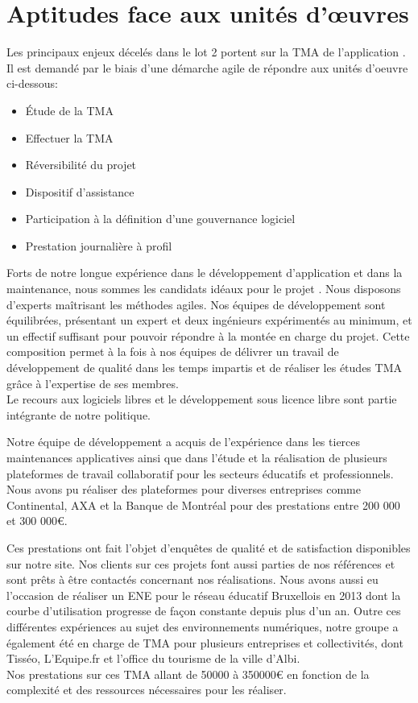 \section{Aptitudes face aux unités d'œuvres}
	Les principaux enjeux décelés dans le lot 2 portent sur la TMA de l’application \correlyce{}. Il est demandé par le biais d’une démarche agile de répondre aux unités d’oeuvre ci-dessous: 
	
	\begin{itemize}
		\item Étude de la TMA
		\item Effectuer la TMA
		\item Réversibilité du projet
		\item Dispositif d’assistance
		\item Participation à la définition d’une gouvernance logiciel
		\item Prestation journalière à profil 
	\end{itemize}

	Forts de notre longue expérience dans le développement d’application et dans la maintenance, nous sommes les candidats idéaux pour le projet \correlyce{}. Nous disposons d’experts maîtrisant les méthodes agiles. Nos équipes de développement sont équilibrées, présentant un expert et deux ingénieurs expérimentés au minimum, et un effectif suffisant pour pouvoir répondre à la montée en charge du projet. Cette composition permet à la fois à nos équipes de délivrer un travail de développement de qualité dans les temps impartis et de réaliser les études TMA grâce à l’expertise de ses membres. \\ Le recours aux logiciels libres et le développement sous licence libre sont partie intégrante de notre politique.
	
	Notre équipe de développement a acquis de l’expérience dans les tierces maintenances applicatives ainsi que dans l’étude et la réalisation de plusieurs plateformes de travail collaboratif pour les secteurs éducatifs et professionnels. Nous avons pu réaliser des plateformes pour diverses entreprises comme Continental, AXA et la Banque de Montréal pour des prestations entre 200 000 et 300 000\euro{}.
	
	Ces prestations ont fait l’objet d’enquêtes de qualité et de satisfaction disponibles sur notre site. Nos clients sur ces projets font aussi parties de nos références et sont prêts à être contactés concernant nos réalisations. Nous avons aussi eu l’occasion de réaliser un ENE pour le réseau éducatif Bruxellois en 2013 dont la courbe d’utilisation progresse de façon constante depuis plus d’un an. Outre ces différentes expériences au sujet des environnements numériques, notre groupe a également été en charge de TMA pour plusieurs entreprises et collectivités, dont Tisséo, L'Equipe.fr et l’office du tourisme de la ville d’Albi.\\
	Nos prestations sur ces TMA allant de 50000 à 350000\euro{} en fonction de la complexité et des ressources nécessaires pour les réaliser.
	
